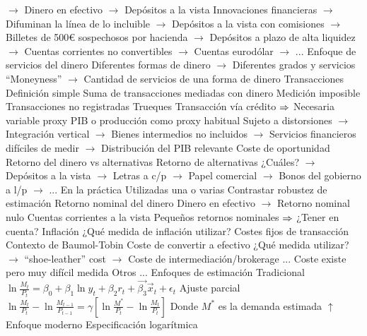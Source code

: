 \documentclass{nuevotema}
\begin{document}
\begin{esquemal}
				\4[] $\to$ Dinero en efectivo
				\4[] $\to$ Depósitos a la vista
				\4[] Innovaciones financieras
				\4[] $\to$ Difuminan la línea de lo incluible
				\4[] $\to$ Depósitos a la vista con comisiones
				\4[] $\to$ Billetes de 500€ sospechosos por hacienda
				\4[] $\to$ Depósitos a plazo de alta liquidez
				\4[] $\to$ Cuentas corrientes no convertibles
				\4[] $\to$ Cuentas eurodólar
				\4[] $\to$ ...
				\4 Enfoque de servicios del dinero
				\4[] Diferentes formas de dinero
				\4[] $\to$ Diferentes grados y servicios
				\4[] ``Moneyness''
				\4[] $\to$ Cantidad de servicios de una forma de dinero
			\3 Transacciones
				\4 Definición simple
				\4[] Suma de transacciones mediadas con dinero
				\4 Medición imposible
				\4[] Transacciones no registradas
				\4[] Trueques
				\4[] Transacción vía crédito
				\4[] $\then$ Necesaria variable proxy
				\4 PIB o producción como proxy habitual
				\4[] Sujeto a distorsiones
				\4[] $\to$ Integración vertical
				\4[] $\to$ Bienes intermedios no incluidos
				\4[] $\to$ Servicios financieros difíciles de medir
				\4[] $\to$ Distribución del PIB relevante
			\3 Coste de oportunidad
				\4 Retorno del dinero vs alternativas
				\4 Retorno de alternativas
				\4[] ¿Cuáles?
				\4[] $\to$ Depósitos a la vista
				\4[] $\to$ Letras a c/p
				\4[] $\to$ Papel comercial
				\4[] $\to$ Bonos del gobierno a l/p
				\4[] $\to$ ...
				\4 En la práctica
				\4[] Utilizadas una o varias
				\4[] Contrastar robustez de estimación
			\3 Retorno nominal del dinero
				\4 Dinero en efectivo
				\4[] $\to$ Retorno nominal nulo
				\4 Cuentas corrientes a la vista
				\4[] Pequeños retornos nominales
				\4[] $\then$ ¿Tener en cuenta?
			\3 Inflación
				\4 ¿Qué medida de inflación utilizar?
			\3 Costes fijos de transacción
				\4 Contexto de Baumol-Tobin
				\4[] Coste de convertir a efectivo
				\4 ¿Qué medida utilizar?
				\4[] $\to$ ``shoe-leather'' cost
				\4[] $\to$ Coste de intermediación/brokerage
				\4[] ...
				\4[$\then$] Coste existe pero muy difícil medida
			\3 Otros
				\4[] ...
		\2 Enfoques de estimación
			\3 Tradicional
				\4 $\ln \frac{M_t}{P_t} = \beta_0 + \beta_1 \ln y_t + \beta_2  r_t + \vec{\beta_3} \vec{x}_t + \epsilon_t$
			\3 Ajuste parcial
				\4 $\ln \frac{M_t}{P_t} - \ln \frac{M_{t-1}}{P_{t-1}} = \gamma \left[ \ln \frac{M^*}{P_t} - \ln \frac{M_t}{P_t} \right]$
				\4[] Donde $M^*$ es la demanda estimada $\uparrow$
			\3 Enfoque moderno
				\4 Especificación logarítmica
				\4[] 

\end{esquemal}
\end{document}
